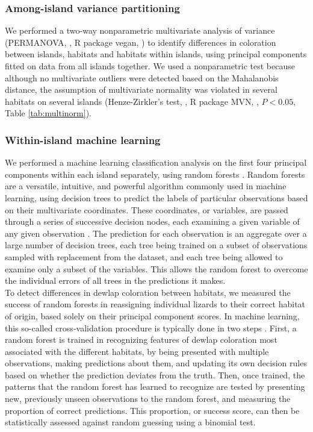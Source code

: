 \subsubsection*{Among-island variance partitioning}

We performed a two-way nonparametric multivariate analysis of variance (PERMANOVA, \citealt{Anderson2001}, R package vegan, \citealt{Oksanen2019}) to identify differences in coloration between islands, habitats and habitats within islands, using principal components fitted on data from all islands together. We used a nonparametric test because although no multivariate outliers were detected based on the Mahalanobis distance, the assumption of multivariate normality was violated in several habitats on several islands (Henze-Zirkler's test, \citealt{Henze1990}, R package MVN, \citealt{Korkmaz2014}, $P < 0.05$, Table \ref{tab:multinorm}).

\subsubsection*{Within-island machine learning}

We performed a machine learning classification analysis on the first four principal components within each island separately, using random forests \citep{Breiman2001}. Random forests are a versatile, intuitive, and powerful algorithm commonly used in machine learning, using decision trees to predict the labels of particular observations based on their multivariate coordinates. These coordinates, or variables, are passed through a series of successive decision nodes, each examining a given variable of any given observation \citep{James2013}. The prediction for each observation is an aggregate over a large number of decision trees, each tree being trained on a subset of observations sampled with replacement from the dataset, and each tree being allowed to examine only a subset of the variables. This allows the random forest to overcome the individual errors of all trees in the predictions it makes.\\

To detect differences in dewlap coloration between habitats, we measured the success of random forests in reassigning individual lizards to their correct habitat of origin, based solely on their principal component scores. In machine learning, this so-called cross-validation procedure is typically done in two steps \citep{James2013}. First, a random forest is trained in recognizing features of dewlap coloration most associated with the different habitats, by being presented with multiple observations, making predictions about them, and updating its own decision rules based on whether the prediction deviates from the truth. Then, once trained, the patterns that the random forest has learned to recognize are tested by presenting new, previously unseen observations to the random forest, and measuring the proportion of correct predictions. This proportion, or success score, can then be statistically assessed against random guessing using a binomial test.\\

